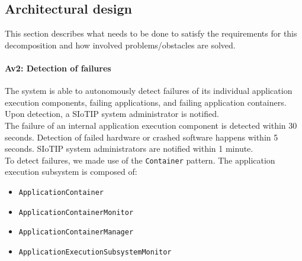 \subsection{Architectural design}
    This section describes what needs to be done to satisfy the requirements for
    this decomposition and how involved problems/obstacles are solved.


    \paragraph{Av2: Detection of failures}
        The system is able to autonomously detect failures of its individual
        application execution components, failing applications, and failing application containers. \\
        Upon detection, a SIoTIP system administrator is notified. \\
        The failure of an internal application execution component is detected within 30 seconds.
        Detection of failed hardware or crashed software happens within 5 seconds.
        SIoTIP system administrators are notified within 1 minute.\\

        To detect failures, we made use of the \texttt{Container} pattern.
        The application execution subsystem is composed of:
        \begin{itemize}
            \item \texttt{ApplicationContainer}
            \item \texttt{ApplicationContainerMonitor}
            \item \texttt{ApplicationContainerManager}
            \item \texttt{ApplicationExecutionSubsystemMonitor}
        \end{itemize}

